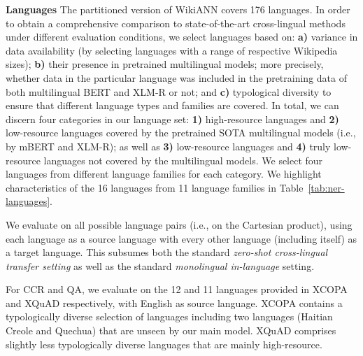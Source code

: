 \documentclass[11pt,a4paper]{article}
\begin{document}
\vspace{1.8mm}
\noindent \textbf{Languages}\hspace{0.3mm} 
The partitioned version of WikiANN covers 176 languages. In order to obtain a comprehensive comparison to state-of-the-art cross-lingual methods under different evaluation conditions, we select languages based on: \textbf{a)} variance in data availability (by selecting languages with a range of respective Wikipedia sizes); \textbf{b)} their presence in pretrained multilingual models; more precisely, whether data in the particular language was included in the pretraining data of both multilingual BERT and XLM-R or not; and \textbf{c)} typological diversity to ensure that different language types and families are covered. In total, we can discern four categories in our language set: \textbf{1)} high-resource languages and \textbf{2)} low-resource languages covered by the pretrained SOTA multilingual models (i.e., by mBERT and XLM-R); as well as \textbf{3)} low-resource languages and \textbf{4)} truly low-resource languages not covered by the multilingual models. We select four languages from different language families for each category. We highlight characteristics of the 16 languages from 11 language families in Table~\ref{tab:ner-languages}.

We evaluate on all possible language pairs (i.e., on the Cartesian product), using each language as a source language with every other language (including itself) as a target language. This subsumes both the standard \textit{zero-shot cross-lingual transfer setting} \cite{Hu2020xtreme} as well as the standard \textit{monolingual in-language} setting.

For CCR and QA, we evaluate on the 12 and 11 languages provided in XCOPA and XQuAD respectively, with English as source language. XCOPA contains a typologically diverse selection of languages including two languages (Haitian Creole and Quechua) that are unseen by our main model. XQuAD comprises slightly less typologically diverse languages that are mainly high-resource.
\end{document}
